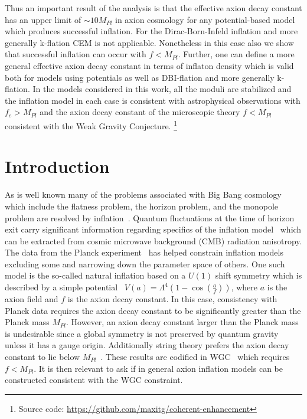 \documentclass[12pt]{article}
\begin{document}
Thus an important result of the analysis is that the effective axion decay constant has an upper limit of $\sim 10 M_{Pl}$ in axion cosmology for any potential-based model which produces successful inflation.
For the Dirac-Born-Infeld inflation and more generally k-flation CEM is not applicable.
Nonetheless in this case also we show that successful inflation can occur with $f < M_{Pl}$.
Further, one can define a more general effective axion decay constant in terms of inflaton density which is valid both for models using potentials as well as DBI-flation and more generally k-flation.
In the models considered in this work, all the moduli are stabilized and the inflation model in each case is consistent with astrophysical observations with $f_e > M_{Pl}$ and the axion decay constant of the microscopic theory $f < M_{Pl}$ consistent with the Weak Gravity Conjecture.
\footnote{Source code: \url{https://github.com/maxitg/coherent-enhancement}}
\newpage

\section{Introduction \label{sec:Introduction}}
As is well known many of the problems associated with Big Bang cosmology which include
the flatness problem, the horizon problem, and the monopole problem are resolved by inflation~\cite{Guth:1980zm, Starobinsky:1980te, Linde:1981mu, Albrecht:1982wi, Linde:1983gd}.
Quantum fluctuations at the time of horizon exit carry significant information regarding specifics of the inflation model~\cite{Mukhanov:1981xt, Hawking:1982cz, Starobinsky:1982ee, Guth:1982ec, Bardeen:1983qw, Cheung:2007st} which can be extracted from cosmic microwave background (CMB) radiation anisotropy.
The data from the Planck experiment~\cite{Akrami:2018vks, Akrami:2018odb, Array:2015xqh} has helped constrain inflation models excluding some and narrowing down the parameter space of others.
One such model is the so-called natural inflation based on a $U(1)$ shift symmetry which is described by a simple potential~\cite{Freese:1990rb, Adams:1992bn} $V\left(a\right) = \Lambda^4 \left(1 - \cos\left(\frac{a}{f}\right)\right)$, where $a$ is the axion field and $f$ is the axion decay constant.
In this case, consistency with Planck data requires the axion decay constant to be significantly greater than the Planck mass $M_{Pl}$.
However, an axion decay constant larger than the Planck mass is undesirable since a global symmetry is not preserved by quantum gravity unless it has a gauge origin.
Additionally string theory prefers the axion decay constant to lie below $M_{Pl}$~\cite{Banks:2003sx, Svrcek:2006yi}.
These results are codified in WGC~\cite{ArkaniHamed:2006dz} which requires $f < M_{Pl}$.
It is then relevant to ask if in general axion inflation models can be constructed consistent with the WGC constraint.
\end{document}
